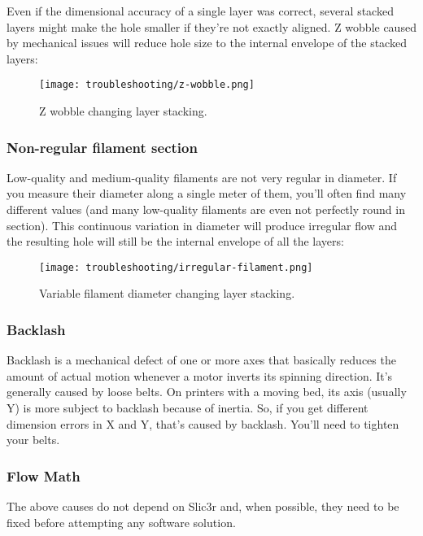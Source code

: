 Even if the dimensional accuracy of a single layer was correct, several stacked layers might make the hole smaller if they're not exactly aligned. Z wobble caused by mechanical issues will reduce hole size to the internal envelope of the stacked layers:

\begin{figure}[H]
\centering
\texttt{[image: troubleshooting/z-wobble.png]}
\caption{Z wobble changing layer stacking.}
\label{fig:z-wobble}
\end{figure}

\subsubsection{Non-regular filament section}

Low-quality and medium-quality filaments are not very regular in diameter. If you measure their diameter along a single meter of them, you'll often find many different values (and many low-quality filaments are even not perfectly round in section). This continuous variation in diameter will produce irregular flow and the resulting hole will still be the internal envelope of all the layers:

\begin{figure}[H]
\centering
\texttt{[image: troubleshooting/irregular-filament.png]}
\caption{Variable filament diameter changing layer stacking.}
\label{fig:irregular-filament}
\end{figure}

\subsubsection{Backlash}

Backlash is a mechanical defect of one or more axes that basically reduces the amount of actual motion whenever a motor inverts its spinning direction. It's generally caused by loose belts. On printers with a moving bed, its axis (usually Y) is more subject to backlash because of inertia. So, if you get different dimension errors in X and Y, that's caused by backlash. You'll need to tighten your belts.

\subsubsection{Flow Math}
The above causes do not depend on Slic3r and, when possible, they need to be fixed before attempting any software solution.

